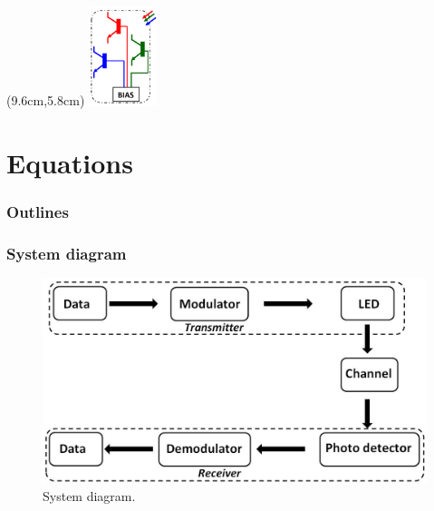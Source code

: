 \documentclass[mathserif]{beamer}
\begin{document}
\begin{frame}
	\begin{textblock*}{2cm}(9.6cm,5.8cm) %
		\includegraphics[width=2cm]{figuras/pd.png}
	\end{textblock*}
\end{frame}


\section{Equations}
\begin{frame}
\frametitle{Outlines}
	\small
	\tableofcontents[currentsection]
\end{frame}
\begin{frame}
\frametitle{System diagram}
	\begin{figure}
		\centering
		\includegraphics[width=\linewidth]{figuras/transceptor}
		\caption{System diagram.}
		\label{fig:transceptor}
	\end{figure}
\end{frame}
\end{document}
